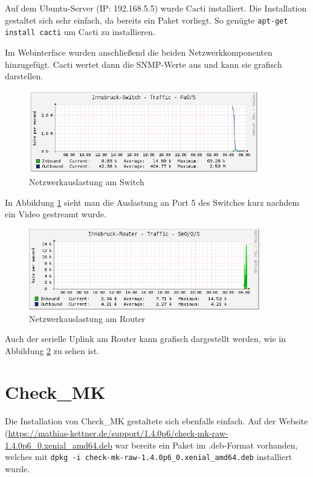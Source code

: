 Auf dem Ubuntu-Server (IP: 192.168.5.5) wurde Cacti installiert. Die Installation gestaltet sich sehr einfach, da bereits ein Paket vorliegt. 
So genügte \texttt{apt-get install cacti} um Cacti zu installieren.

Im Webinterface wurden anschließend die beiden Netzwerkkomponenten hinzugefügt. Cacti wertet dann die \ac{SNMP}-Werte aus und kann sie grafisch darstellen.

\begin{figure}[H]
	\centering
	\includegraphics[width=0.9\textwidth]{img/andi_youtube.PNG}
	\caption{Netzwerkauslastung am Switch}
	\label{img:yt}
\end{figure}

In Abbildung \ref{img:yt} sieht man die Auslastung an Port 5 des Switches kurz nachdem ein Video gestreamt wurde. 

\begin{figure}[H]
	\centering
	\includegraphics[width=0.9\textwidth]{img/cacti_graph_s00.PNG}
	\caption{Netzwerkauslastung am Router}
	\label{img:uplink}
\end{figure}

Auch der serielle Uplink am Router kann grafisch dargestellt werden, wie in Abbildung \ref{img:uplink} zu sehen ist.

\chapter{Check\_MK}
\label{checkmk}

Die Installation von Check\_MK gestaltete sich ebenfalls einfach. Auf der Website (\url{https://mathias-kettner.de/support/1.4.0p6/check-mk-raw-1.4.0p6_0.xenial_amd64.deb} war bereits ein Paket im .deb-Format vorhanden, welches mit \texttt{dpkg -i check-mk-raw-1.4.0p6\_0.xenial\_amd64.deb} installiert wurde.

